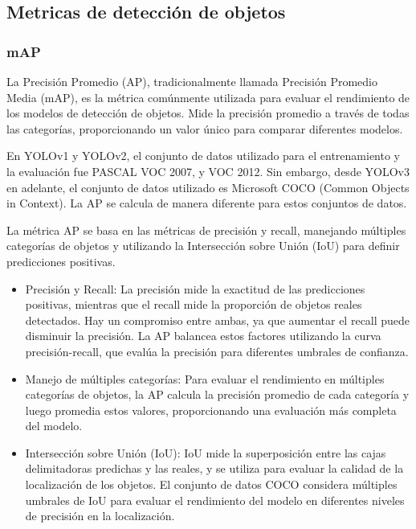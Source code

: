 \subsection*{Metricas de detección de objetos}
\subsubsection*{mAP}
La Precisión Promedio (AP), tradicionalmente llamada Precisión Promedio Media (mAP), es la métrica comúnmente utilizada para evaluar el rendimiento de los modelos de detección de objetos. Mide la precisión promedio a través de todas las categorías, proporcionando un valor único para comparar diferentes modelos. 

En YOLOv1 y YOLOv2, el conjunto de datos utilizado para el entrenamiento y la evaluación fue PASCAL VOC 2007, y VOC 2012. Sin embargo, desde YOLOv3 en adelante, el conjunto de datos utilizado es Microsoft COCO (Common Objects in Context). La AP se calcula de manera diferente para estos conjuntos de datos. 

La métrica AP se basa en las métricas de precisión y recall, manejando múltiples categorías de objetos y utilizando la Intersección sobre Unión (IoU) para definir predicciones positivas.

\begin{itemize}
    \item Precisión y Recall: La precisión mide la exactitud de las predicciones positivas, mientras que el recall mide la proporción de objetos reales detectados. Hay un compromiso entre ambas, ya que aumentar el recall puede disminuir la precisión. La AP balancea estos factores utilizando la curva precisión-recall, que evalúa la precisión para diferentes umbrales de confianza.
    
    \item Manejo de múltiples categorías: Para evaluar el rendimiento en múltiples categorías de objetos, la AP calcula la precisión promedio de cada categoría y luego promedia estos valores, proporcionando una evaluación más completa del modelo.
    
    \item Intersección sobre Unión (IoU): IoU mide la superposición entre las cajas delimitadoras predichas y las reales, y se utiliza para evaluar la calidad de la localización de los objetos. El conjunto de datos COCO considera múltiples umbrales de IoU para evaluar el rendimiento del modelo en diferentes niveles de precisión en la localización.
\end{itemize}

